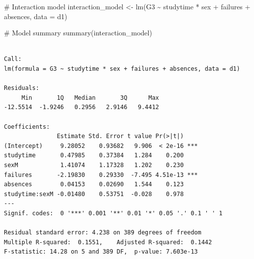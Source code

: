 \documentclass[
  10pt,
]{article}
\newenvironment{Shaded}{\begin{snugshade}}{\end{snugshade}}
\newcommand{\AttributeTok}[1]{\textcolor[rgb]{0.40,0.45,0.13}{#1}}
\newcommand{\CommentTok}[1]{\textcolor[rgb]{0.37,0.37,0.37}{#1}}
\newcommand{\FunctionTok}[1]{\textcolor[rgb]{0.28,0.35,0.67}{#1}}
\newcommand{\NormalTok}[1]{\textcolor[rgb]{0.00,0.23,0.31}{#1}}
\newcommand{\OtherTok}[1]{\textcolor[rgb]{0.00,0.23,0.31}{#1}}
\newcommand{\SpecialCharTok}[1]{\textcolor[rgb]{0.37,0.37,0.37}{#1}}
\begin{document}
\begin{Shaded}
\begin{Highlighting}[]
\CommentTok{\# Interaction model}
\NormalTok{interaction\_model }\OtherTok{\textless{}{-}} \FunctionTok{lm}\NormalTok{(G3 }\SpecialCharTok{\textasciitilde{}}\NormalTok{ studytime }\SpecialCharTok{*}\NormalTok{ sex }\SpecialCharTok{+}\NormalTok{ failures }\SpecialCharTok{+}\NormalTok{ absences, }\AttributeTok{data =}\NormalTok{ d1)}

\CommentTok{\# Model summary}
\FunctionTok{summary}\NormalTok{(interaction\_model)}
\end{Highlighting}
\end{Shaded}

\begin{verbatim}

Call:
lm(formula = G3 ~ studytime * sex + failures + absences, data = d1)

Residuals:
     Min       1Q   Median       3Q      Max 
-12.5514  -1.9246   0.2956   2.9146   9.4412 

Coefficients:
               Estimate Std. Error t value Pr(>|t|)    
(Intercept)     9.28052    0.93682   9.906  < 2e-16 ***
studytime       0.47985    0.37384   1.284    0.200    
sexM            1.41074    1.17328   1.202    0.230    
failures       -2.19830    0.29330  -7.495 4.51e-13 ***
absences        0.04153    0.02690   1.544    0.123    
studytime:sexM -0.01480    0.53751  -0.028    0.978    
---
Signif. codes:  0 '***' 0.001 '**' 0.01 '*' 0.05 '.' 0.1 ' ' 1

Residual standard error: 4.238 on 389 degrees of freedom
Multiple R-squared:  0.1551,    Adjusted R-squared:  0.1442 
F-statistic: 14.28 on 5 and 389 DF,  p-value: 7.603e-13
\end{verbatim}
\end{document}

